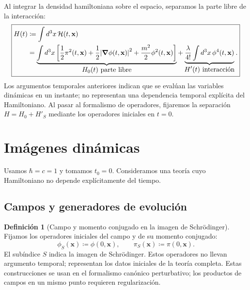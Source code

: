 \documentclass[11pt,letterpaper]{article}
\theoremstyle{definition}
\newtheorem{definicion}{Definición}
\theoremstyle{definition}
\newcommand{\eqbox}[1]{\boxed{\displaystyle #1}}
\begin{document}
Al integrar la densidad hamiltoniana sobre el espacio, separamos la parte libre
de la interacción:
\begin{equation}
  \boxed{\begin{aligned}
  H(t)
  &\coloneqq\int d^3x\,\mathcal{H}(t,\mathbf{x})
  \\
  &=
  \underbrace{\int d^3x\left[
    \frac{1}{2}\pi^2(t,\mathbf{x})
    +\frac{1}{2}\abs{\grad\phi(t,\mathbf{x})}^2
    +\frac{m^2}{2}\phi^2(t,\mathbf{x})
  \right]}_{\displaystyle H_0(t)\ \text{parte libre}}
  +
  \underbrace{\frac{\lambda}{4!}\int d^3x\,\phi^4(t,\mathbf{x})}
  _{\displaystyle H'(t)\ \text{interacción}} .
  \end{aligned}}
\end{equation}
Los argumentos temporales anteriores indican que se evalúan las variables
dinámicas en un instante; no representan una dependencia temporal explícita
del Hamiltoniano. Al pasar al formalismo de operadores, fijaremos la
separación $H=H_0+H'_S$ mediante los operadores iniciales en $t=0$.

\section{Imágenes dinámicas}

Usamos $\hbar=c=1$ y tomamos $t_0=0$. Consideramos una teoría cuyo Hamiltoniano
no depende explícitamente del tiempo.

\subsection{Campos y generadores de evolución}

\begin{definicion}[Campo y momento conjugado en la imagen de Schrödinger]
Fijamos los operadores iniciales del campo y de su momento conjugado:
\begin{equation}
  \eqbox{\phi_S(\mathbf{x})\coloneqq\phi(0,\mathbf{x}),
  \qquad
  \pi_S(\mathbf{x})\coloneqq\pi(0,\mathbf{x}).}
  \label{eq:phiSinitial}
\end{equation}
El subíndice $S$ indica la imagen de Schrödinger. Estos operadores no llevan
argumento temporal; representan los datos iniciales de la teoría completa.
Estas construcciones se usan en el formalismo canónico perturbativo;
los productos de campos en un mismo punto requieren regularización.
\end{definicion}
\end{document}
